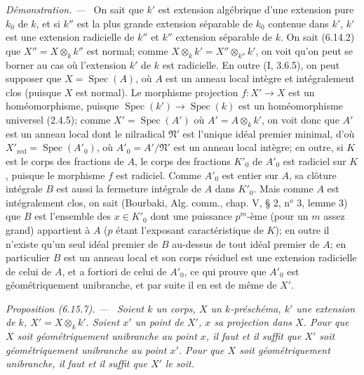 \documentclass[10pt,oneside]{book}
\makeatletter
\newenvironment{proposition}[1][]{%
  \par\medskip\noindent\itshape Proposition (#1). ---\ }{\par}
\newenvironment{proof}{%
  \par\medskip\noindent\textit{Démonstration. ---\ }}{\par}
\newcommand{\EGAReaderTarget}[2]{\hypertarget{#1}{}\@bsphack\begingroup\def\@currentHref{#1}\label{#2}\endgroup\@esphack}
\makeatother
\begin{document}
\begin{proof}
On sait que $k'$ est extension algébrique d'une extension pure $k_0$ de
$k$, et si $k''$ est la plus grande extension séparable de $k_0$ contenue
dans $k'$, $k'$ est une extension radicielle de $k''$ et $k''$ extension
séparable de $k$. On sait (6.14.2) que $X''=X\otimes_k k''$ est normal;
comme $X\otimes_k k'=X''\otimes_{k''}k'$, on voit qu'on peut se borner au
cas où l'extension $k'$ de $k$ est radicielle. En outre (I, 3.6.5), on peut
supposer que $X=\operatorname{Spec}(A)$, où $A$ est un anneau local intègre
et intégralement clos (puisque $X$ est normal). Le morphisme projection
$f:X'\to X$ est un homéomorphisme, puisque
$\operatorname{Spec}(k')\to\operatorname{Spec}(k)$ est un homéomorphisme
universel (2.4.5); comme $X'=\operatorname{Spec}(A')$ où
$A'=A\otimes_k k'$, on voit donc que $A'$ est un anneau local dont le
nilradical $\mathfrak N'$ est l'unique idéal premier minimal, d'où
$X'_{\mathrm{red}}=\operatorname{Spec}(A'_0)$, où
$A'_0=A'/\mathfrak N'$ est un anneau local intègre; en outre, si $K$ est
le corps des fractions de $A$, le corps des fractions $K'_0$ de $A'_0$ est
radiciel sur $K$, puisque le morphisme $f$ est radiciel. Comme $A'_0$ est
entier sur $A$, sa clôture intégrale $B$ est aussi la fermeture intégrale
de $A$ dans $K'_0$. Mais comme $A$ est intégralement clos, on sait
(Bourbaki, Alg. comm., chap. V, § 2, n$^o$ 3, lemme 3) que $B$ est
l'ensemble des $x\in K'_0$ dont une puissance $p^m$-ème (pour un $m$ assez
grand) appartient à $A$ ($p$ étant l'exposant caractéristique de $K$);
en outre il n'existe qu'un seul idéal premier de $B$ au-dessus de tout idéal
premier de $A$; en particulier $B$ est un anneau local et son corps résiduel
est une extension radicielle de celui de $A$, et a fortiori de celui de
$A'_0$, ce qui prouve que $A'_0$ est géométriquement unibranche, et par
suite il en est de même de $X'$.
\end{proof}

\begin{proposition}[6.15.7]
\EGAReaderTarget{ega4.c04.prop.6-15-7}{IV.2.s6.15.7-fr}
Soient $k$ un corps, $X$ un $k$-préschéma, $k'$ une extension de $k$,
$X'=X\otimes_k k'$. Soient $x'$ un point de $X'$, $x$ sa projection dans
$X$. Pour que $X$ soit géométriquement unibranche au point $x$, il faut et
il suffit que $X'$ soit géométriquement unibranche au point $x'$. Pour que
$X$ soit géométriquement unibranche, il faut et il suffit que $X'$ le soit.
\end{proposition}
\end{document}
